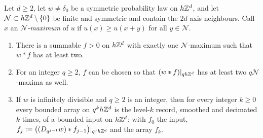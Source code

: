 \begin{proposition}
\label{prop:creation-grid}
\leanok
{}
Let $d \ge 2$, let $w \ne \delta_0$ be a symmetric probability law on $h\mathbb{Z}^d$, and let
$\mathcal{N} \subset h\mathbb{Z}^d \setminus \{0\}$ be finite and symmetric and
contain the $2d$ axis neighbours. Call $x$ an \emph{$\mathcal{N}$-maximum} of $u$ if
$u(x) \ge u(x + y)$ for all $y \in \mathcal{N}$.
\begin{enumerate}
\item There is a summable $f > 0$ on $h\mathbb{Z}^d$ with exactly one $\mathcal{N}$-maximum such that
$w * f$ has at least two.
\item For an integer $q \ge 2$, $f$ can be chosen so that $(w * f)|_{qh\mathbb{Z}^d}$ has at least two
$q\mathcal{N}$-maxima as well.
\item If $w$ is infinitely divisible and $q \ge 2$ is an integer, then for every integer $k \ge 0$
every bounded array on $q^kh\mathbb{Z}^d$ is the level-$k$ record, smoothed and decimated $k$ times, of a bounded input on
$h\mathbb{Z}^d$: with $f_0$ the input, $f_j := \bigl((D_{q^{j-1}}w) * f_{j-1}\bigr)|_{q^jh\mathbb{Z}^d}$ and the
array $f_k$.
\end{enumerate}

\end{proposition}
